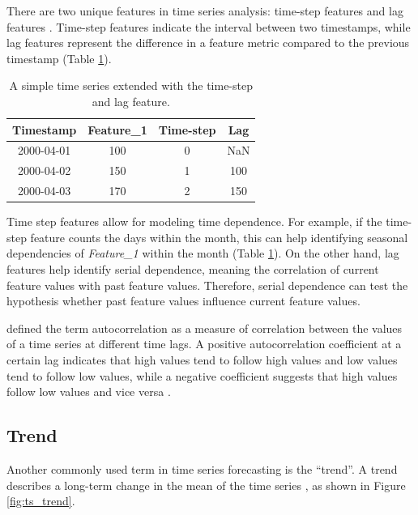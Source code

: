 There are two unique features in time series analysis: time-step features and lag
features \parencite{haben2023time}. Time-step features indicate the interval between
two timestamps, while lag features represent the difference in a feature metric
compared to the previous timestamp (Table \ref{tab:time_series_extended}).


\begin{table}[h]
    \centering
    \begin{tabular}{|c|c|c|c|}
        \hline
        \textbf{Timestamp} & \textbf{Feature\_1} & \textbf{Time-step} & \textbf{Lag} \\
        \hline
        2000-04-01         & 100                 & 0                  & NaN          \\
        \hline
        2000-04-02         & 150                 & 1                  & 100          \\
        \hline
        2000-04-03         & 170                 & 2                  & 150          \\
        \hline
    \end{tabular}
    \caption{A simple time series extended with the time-step and lag feature.}
    \label{tab:time_series_extended}
\end{table}

Time step features allow for modeling time dependence. For example, if the time-step
feature counts the days within the month, this can help identifying seasonal
dependencies of \textit{Feature\_1} within the month (Table \ref{tab:time_series_extended}).
On the other hand, lag features help identify serial dependence, meaning the correlation of
current feature values with past feature values. Therefore, serial dependence can test the
hypothesis whether past feature values influence current feature values.

\textcite{box2015time} defined the term autocorrelation as a measure of correlation
between the values of a time series at different time lags. A positive autocorrelation
coefficient at a certain lag indicates that high values tend to follow high values and
low values tend to follow low values, while a negative coefficient suggests that high
values follow low values and vice versa \parencite[ch. 2]{box2015time}.

\subsection{Trend}

Another commonly used term in time series forecasting is the ``trend''. A
trend describes a long-term change in the mean of the time series \parencite[ch. 5]{haben2023time},
as shown in Figure \ref{fig:ts_trend}.

